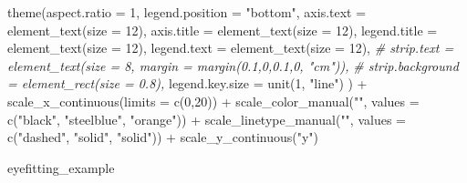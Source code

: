 \documentclass[print]{nuthesis}
\newenvironment{Shaded}{\begin{snugshade}}{\end{snugshade}}
\newcommand{\AttributeTok}[1]{\textcolor[rgb]{0.77,0.63,0.00}{#1}}
\newcommand{\CommentTok}[1]{\textcolor[rgb]{0.56,0.35,0.01}{\textit{#1}}}
\newcommand{\DecValTok}[1]{\textcolor[rgb]{0.00,0.00,0.81}{#1}}
\newcommand{\FunctionTok}[1]{\textcolor[rgb]{0.00,0.00,0.00}{#1}}
\newcommand{\NormalTok}[1]{#1}
\newcommand{\SpecialCharTok}[1]{\textcolor[rgb]{0.00,0.00,0.00}{#1}}
\newcommand{\StringTok}[1]{\textcolor[rgb]{0.31,0.60,0.02}{#1}}
\begin{document}
\begin{Shaded}
\begin{Highlighting}[]
  \FunctionTok{theme}\NormalTok{(}\AttributeTok{aspect.ratio =} \DecValTok{1}\NormalTok{,}
        \AttributeTok{legend.position =} \StringTok{"bottom"}\NormalTok{,}
        \AttributeTok{axis.text    =} \FunctionTok{element\_text}\NormalTok{(}\AttributeTok{size =} \DecValTok{12}\NormalTok{),}
        \AttributeTok{axis.title   =} \FunctionTok{element\_text}\NormalTok{(}\AttributeTok{size =} \DecValTok{12}\NormalTok{),}
        \AttributeTok{legend.title =} \FunctionTok{element\_text}\NormalTok{(}\AttributeTok{size =} \DecValTok{12}\NormalTok{),}
        \AttributeTok{legend.text  =} \FunctionTok{element\_text}\NormalTok{(}\AttributeTok{size =} \DecValTok{12}\NormalTok{),}
        \CommentTok{\# strip.text = element\_text(size = 8, margin = margin(0.1,0,0.1,0, "cm")),}
        \CommentTok{\# strip.background = element\_rect(size = 0.8),}
        \AttributeTok{legend.key.size =} \FunctionTok{unit}\NormalTok{(}\DecValTok{1}\NormalTok{, }\StringTok{"line"}\NormalTok{)}
\NormalTok{        ) }\SpecialCharTok{+}
  \FunctionTok{scale\_x\_continuous}\NormalTok{(}\AttributeTok{limits =} \FunctionTok{c}\NormalTok{(}\DecValTok{0}\NormalTok{,}\DecValTok{20}\NormalTok{)) }\SpecialCharTok{+}
  \FunctionTok{scale\_color\_manual}\NormalTok{(}\StringTok{""}\NormalTok{, }\AttributeTok{values =} \FunctionTok{c}\NormalTok{(}\StringTok{"black"}\NormalTok{, }\StringTok{"steelblue"}\NormalTok{, }\StringTok{"orange"}\NormalTok{)) }\SpecialCharTok{+}
  \FunctionTok{scale\_linetype\_manual}\NormalTok{(}\StringTok{""}\NormalTok{, }\AttributeTok{values =} \FunctionTok{c}\NormalTok{(}\StringTok{"dashed"}\NormalTok{, }\StringTok{"solid"}\NormalTok{, }\StringTok{"solid"}\NormalTok{)) }\SpecialCharTok{+}
  \FunctionTok{scale\_y\_continuous}\NormalTok{(}\StringTok{"y"}\NormalTok{)}

\NormalTok{eyefitting\_example}
\end{Highlighting}
\end{Shaded}
\end{document}
